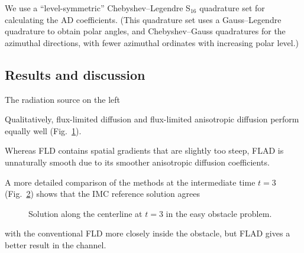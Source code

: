 We use a ``level-symmetric'' Chebyshev--Legendre S$_{16}$ quadrature set for
calculating the AD coefficients. (This quadrature set uses a Gauss--Legendre
quadrature to obtain polar angles, and Chebyshev--Gauss quadratures for the
azimuthal directions, with fewer azimuthal ordinates with increasing polar
level.)

\subsection{Results and discussion}

The radiation source on the left 

Qualitatively, flux-limited diffusion and flux-limited anisotropic diffusion
perform equally well (Fig.~\ref{fig:easymkContour}).
%
\begin{figure}[htb]
  \centering
  \label{fig:easymkContour}
\end{figure}
%
Whereas FLD contains spatial gradients that are slightly
too steep, FLAD is unnaturally smooth due to its smoother anisotropic diffusion
coefficients.

A more detailed comparison of the methods at the intermediate time $t=3$
(Fig.~\ref{fig:easymkCenterline}) shows that the IMC reference solution agrees
%
\begin{figure}[htb]
  \centering
  \caption{Solution along the centerline at $t=3$ in the easy obstacle
  problem.}
  \label{fig:easymkCenterline}
\end{figure}
%
with the conventional FLD more closely inside the obstacle, but FLAD gives a
better result in the channel.

